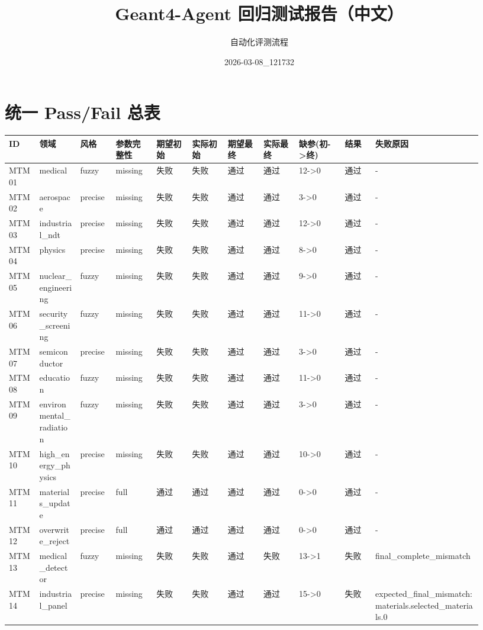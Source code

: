 \documentclass[11pt]{ctexart}
\title{Geant4-Agent 回归测试报告（中文）}
\author{自动化评测流程}
\date{2026-03-08\_121732}
\begin{document}
\maketitle
\section{统一 Pass/Fail 总表}
\begin{longtable}{p{0.06\linewidth}p{0.08\linewidth}p{0.07\linewidth}p{0.08\linewidth}p{0.07\linewidth}p{0.07\linewidth}p{0.07\linewidth}p{0.07\linewidth}p{0.09\linewidth}p{0.06\linewidth}p{0.21\linewidth}}
\toprule
ID & 领域 & 风格 & 参数完整性 & 期望初始 & 实际初始 & 期望最终 & 实际最终 & 缺参(初->终) & 结果 & 失败原因 \\
\midrule
MTM01 & medical & fuzzy & missing & 失败 & 失败 & 通过 & 通过 & 12->0 & 通过 & - \\
MTM02 & aerospace & precise & missing & 失败 & 失败 & 通过 & 通过 & 3->0 & 通过 & - \\
MTM03 & industrial\_ndt & precise & missing & 失败 & 失败 & 通过 & 通过 & 12->0 & 通过 & - \\
MTM04 & physics & precise & missing & 失败 & 失败 & 通过 & 通过 & 8->0 & 通过 & - \\
MTM05 & nuclear\_engineering & fuzzy & missing & 失败 & 失败 & 通过 & 通过 & 9->0 & 通过 & - \\
MTM06 & security\_screening & fuzzy & missing & 失败 & 失败 & 通过 & 通过 & 11->0 & 通过 & - \\
MTM07 & semiconductor & precise & missing & 失败 & 失败 & 通过 & 通过 & 3->0 & 通过 & - \\
MTM08 & education & fuzzy & missing & 失败 & 失败 & 通过 & 通过 & 11->0 & 通过 & - \\
MTM09 & environmental\_radiation & fuzzy & missing & 失败 & 失败 & 通过 & 通过 & 3->0 & 通过 & - \\
MTM10 & high\_energy\_physics & precise & missing & 失败 & 失败 & 通过 & 通过 & 10->0 & 通过 & - \\
MTM11 & materials\_update & precise & full & 通过 & 通过 & 通过 & 通过 & 0->0 & 通过 & - \\
MTM12 & overwrite\_reject & precise & full & 通过 & 通过 & 通过 & 通过 & 0->0 & 通过 & - \\
MTM13 & medical\_detector & fuzzy & missing & 失败 & 失败 & 通过 & 失败 & 13->1 & 失败 & final\_complete\_mismatch \\
MTM14 & industrial\_panel & precise & missing & 失败 & 失败 & 通过 & 通过 & 15->0 & 失败 & expected\_final\_mismatch:materials.selected\_materials.0 \\

\end{longtable}
\end{document}
